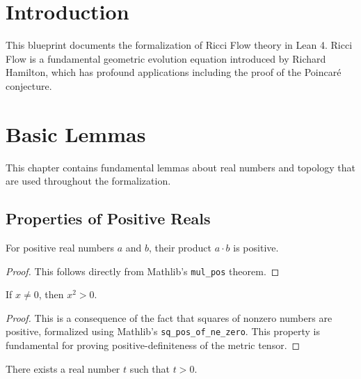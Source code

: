 \chapter{Introduction}

This blueprint documents the formalization of Ricci Flow theory in Lean 4.
Ricci Flow is a fundamental geometric evolution equation introduced by Richard Hamilton,
which has profound applications including the proof of the Poincaré conjecture.

\chapter{Basic Lemmas}
\label{chap:basic}

This chapter contains fundamental lemmas about real numbers and topology
that are used throughout the formalization.

\section{Properties of Positive Reals}

\begin{lemma}
\label{lem:pos_mul_pos}
\leanok
For positive real numbers $a$ and $b$, their product $a \cdot b$ is positive.
\end{lemma}

\begin{proof}
\leanok
This follows directly from Mathlib's \texttt{mul\_pos} theorem.
\end{proof}

\begin{lemma}
\label{lem:square_pos_of_ne_zero}
\leanok
If $x \neq 0$, then $x^2 > 0$.
\end{lemma}

\begin{proof}
\leanok
This is a consequence of the fact that squares of nonzero numbers are positive,
formalized using Mathlib's \texttt{sq\_pos\_of\_ne\_zero}.
This property is fundamental for proving positive-definiteness of the metric tensor.
\end{proof}

\begin{lemma}
\label{lem:exists_pos_real}
\leanok
There exists a real number $t$ such that $t > 0$.
\end{lemma}

